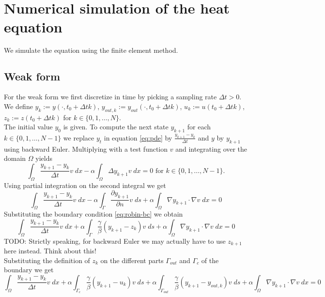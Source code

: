 \documentclass[
12pt, %
a4paper, %
onecolumn, %
portrait %
]{article}
\begin{document}
\section{Numerical simulation of the heat equation}
We simulate the equation using the finite element method.
\subsection{Weak form}
For the weak form we first discretize in time by picking a sampling rate $\Delta t > 0$. We define $y_k := y(\cdot, t_0 + \Delta t k)$, $y_{out,k} := y_{out}(\cdot, t_0 + \Delta t k) $, $u_k := u(t_0 + \Delta t k)$, $z_k := z(t_0 + \Delta t k)$ for $k \in \{0, 1, \hdots, N\}$. \\
The initial value $y_0$ is given. To compute the next state $y_{k+1}$ for each $k \in \{0, 1, \hdots, N-1\}$  we replace $y_t$ in equation \eqref{eq:pde} by $\frac{y_{k+1} - y_k}{\Delta t}$ and $y$ by $y_{k+1}$ using backward Euler. Multiplying with a test function $v$ and integrating over the domain $\Omega$ yields
\begin{equation}
\int_{\Omega} \frac{y_{k+1} - y_k}{\Delta t} v \; dx - \alpha \int_{\Omega} \Delta y_{k+1} v \; dx = 0 \text{ for } k \in \{0, 1, \hdots, N-1\}.
\end{equation}
Using partial integration on the second integral we get
\begin{equation}
\int_{\Omega} \frac{y_{k+1} - y_k}{\Delta t} v \; dx - \alpha \int_{\Gamma}  \frac{\partial y_{k+1}}{\partial n} v \; ds + \alpha \int_{\Omega} \nabla y_{k+1} \cdot \nabla v \; dx = 0
\end{equation}
Substituting the boundary condition \eqref{eq:robin-bc} we obtain
\begin{equation}
\int_{\Omega} \frac{y_{k+1} - y_k}{\Delta t} v \; dx + \alpha \int_{\Gamma} \frac{ \gamma}{\beta}  (y_{k+1} - z_k) v \; ds + \alpha \int_{\Omega} \nabla y_{k+1} \cdot \nabla v \; dx = 0
\end{equation}
TODO: Strictly speaking, for backward Euler we may actually have to use $z_{k+1}$ here instead. Think about this!\\
Substituting the definition of $z_k$ on the different parts $\Gamma_{out}$ and $\Gamma_c$ of the boundary we get
\begin{equation}
\int_{\Omega} \frac{y_{k+1} - y_k}{\Delta t} v \; dx +  \alpha \int_{\Gamma_c} \frac{\gamma}{\beta}  (y_{k+1} - u_k) v \; ds  +  \alpha\int_{\Gamma_{out}} \frac{ \gamma}{\beta}  (y_{k+1} - y_{out,k}) v \; ds + \alpha \int_{\Omega} \nabla y_{k+1} \cdot \nabla v \; dx = 0
\label{eq:fem-state-equation}
\end{equation}
\end{document}
